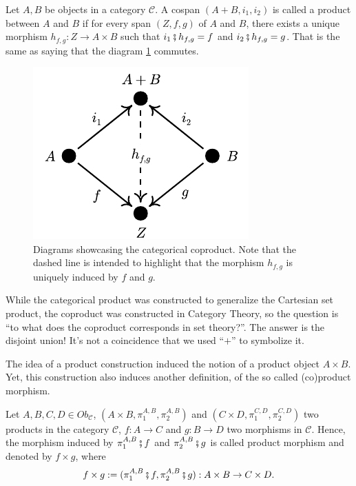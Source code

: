 \begin{definition}
  Let $A,B$ be objects in a  category $\mathcal C$. A cospan $(A + B, i_1, i_2)$
  is called a product between $A$ and $B$ if for every span $(Z, f, g)$ of $A$ and $B$,
  there exists a unique morphism $h_{f,g}:Z \to A \times B$ such that
  $i_1 \fatsemi h_{f,g} = f$ and $i_2 \fatsemi h_{f,g} = g$. That is the same
  as saying that the diagram \ref{fig:Coproduct} commutes.
\end{definition}

\begin{figure}[H]
  \begin{center}
    \includegraphics{./notebooks/CategoricalCoproduct.pdf}
  \end{center}
  \caption{Diagrams showcasing the categorical coproduct. Note that the dashed line
  is intended to highlight that the morphism $h_{f,g}$ is uniquely induced by $f$ and $g$.}
  \label{fig:Coproduct}
\end{figure}

While the categorical product was constructed to generalize the Cartesian set product,
the coproduct was constructed in Category Theory, so the question is
``to what does the coproduct corresponds in set theory?''. The answer is the
disjoint union! It's not a coincidence that we used ``$+$'' to symbolize it.

The idea of a product construction induced the notion of a product object
$A \times B$. Yet, this construction also induces another definition, of the
so called (co)product morphism.

\begin{definition}
  Let $A, B, C, D \in Ob_\mathcal C$,
  $(A\times B, \pi^{A,B}_1, \pi^{A,B}_2)$ and
  $(C\times D, \pi^{C,D}_1, \pi^{C,D}_2)$ two products in the category $\mathcal C$,
  $f:A\to C$ and $g:B \to D$ two morphisms in $\mathcal C$. Hence, the
  morphism induced by $\pi_1^{A,B} \fatsemi f$ and $\pi_2^{A,B} \fatsemi g$ is
  called product morphism and denoted by $f \times g$, where
  \begin{displaymath}
    f \times g := (\pi_1^{A,B} \fatsemi f, \pi_2^{A,B} \fatsemi g): A\times B \to C \times D.
  \end{displaymath}
\end{definition}

